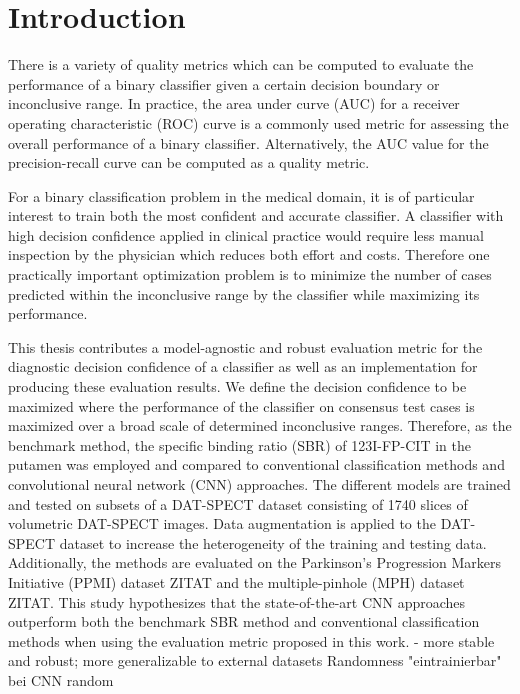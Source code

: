\section{Introduction}
\label{sec:intro}









There is a variety of quality metrics which can be computed to evaluate the performance of a binary classifier 
given a certain decision boundary or inconclusive range.
In practice, the area under curve (AUC) for a receiver operating characteristic (ROC) curve is a commonly used metric 
for assessing the overall performance of a binary classifier.
Alternatively, the AUC value for the precision-recall curve can be computed as a quality metric. 

For a binary classification problem in the medical domain, it is of particular interest to train both the most confident and 
accurate classifier.
A classifier with high decision confidence applied in clinical practice would require less manual inspection by the
physician which reduces both effort and costs.
Therefore one practically important optimization problem is to minimize the number of cases predicted within the inconclusive range 
by the classifier while maximizing its performance.


This thesis contributes a model-agnostic and robust evaluation metric for the diagnostic decision confidence of a classifier 
as well as an implementation for producing these evaluation results.
We define the decision confidence to be maximized where the performance of the classifier on consensus test cases 
is maximized over a broad scale of determined inconclusive ranges.
Therefore, as the benchmark method, the specific binding ratio (SBR) of 123I-FP-CIT in the putamen was employed and 
compared to conventional classification methods and convolutional neural network (CNN) approaches.
The different models are trained and tested on subsets of a DAT-SPECT dataset consisting of 1740 slices of 
volumetric DAT-SPECT images.
Data augmentation is applied to the DAT-SPECT dataset to increase the heterogeneity of the training and testing data.
Additionally, the methods are evaluated on the Parkinson's Progression Markers Initiative (PPMI) dataset ZITAT and 
the multiple-pinhole (MPH) dataset ZITAT.
This study hypothesizes that the state-of-the-art CNN approaches outperform both the benchmark SBR method and conventional 
classification methods when using the evaluation metric proposed in this work.
- more stable and robust; more generalizable to external datasets
Randomness "eintrainierbar" bei CNN random

